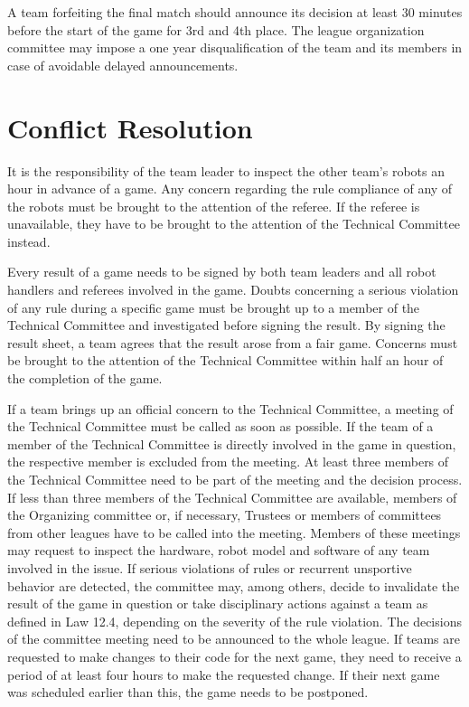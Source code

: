 \documentclass[12pt]{article}
\begin{document}
	A team forfeiting the final match should announce its decision at least 30 minutes before the start of the game for 3rd and 4th place. The league organization committee may impose a one year disqualification of the team and its members in case of avoidable delayed announcements.
	
	\section{Conflict Resolution}
	It is the responsibility of the team leader to inspect the other team’s robots an hour in advance of a game. Any concern regarding the rule compliance of any of the robots must be brought to the attention of the referee. If the referee is unavailable, they have to be brought to the attention of the Technical Committee instead.	
	
	Every result of a game needs to be signed by both team leaders and all robot handlers and referees involved in the game. Doubts concerning a serious violation of any rule during a specific game must be brought up to a member of the Technical Committee and investigated before signing the result. By signing the result sheet, a team agrees that the result arose from a fair game. Concerns must be brought to the attention of the Technical Committee within half an hour of the completion of the game. 
	
	If a team brings up an official concern to the Technical Committee, a meeting of the Technical Committee must be called as soon as possible. If the team of a member of the Technical Committee is	directly involved in the game in question, the respective member is excluded from the meeting. At least three members	of the Technical Committee need to be part of the meeting and the decision process. If less than three members of the Technical Committee are available, members of the Organizing committee or, if necessary, Trustees or members of committees from other leagues have to be called into the meeting. Members of these meetings may request to inspect the hardware, robot model and software of any team involved in the issue. If serious violations of rules or recurrent unsportive behavior are detected, the committee may, among others, decide to invalidate the result of the game in question or take disciplinary actions against a team as defined in Law 12.4, depending on the severity of the rule violation. The decisions of the committee meeting need to be announced to the whole league. If teams are requested to make changes to their code for the next game, they need to receive a period of at least four hours to make the requested change. If their next game was scheduled earlier than this, the game needs to be postponed.
\end{document}
